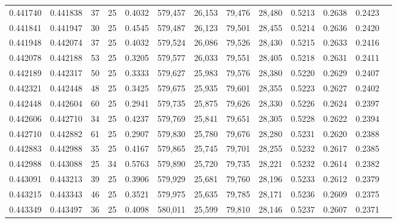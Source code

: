 \begin{tabular}{rrrrrrrrrrrrr}
0.441740 & 0.441838 &    37 &  25 &                                     0.4032 & 579,457 &  26,153 &  79,476 &  28,480 & 0.5213 & 0.2638 & 0.2423 \\
0.441841 & 0.441947 &    30 &  25 &                                     0.4545 & 579,487 &  26,123 &  79,501 &  28,455 & 0.5214 & 0.2636 & 0.2420 \\
0.441948 & 0.442074 &    37 &  25 &                                     0.4032 & 579,524 &  26,086 &  79,526 &  28,430 & 0.5215 & 0.2633 & 0.2416 \\
0.442078 & 0.442188 &    53 &  25 &                                     0.3205 & 579,577 &  26,033 &  79,551 &  28,405 & 0.5218 & 0.2631 & 0.2411 \\
0.442189 & 0.442317 &    50 &  25 &                                     0.3333 & 579,627 &  25,983 &  79,576 &  28,380 & 0.5220 & 0.2629 & 0.2407 \\
0.442321 & 0.442448 &    48 &  25 &                                     0.3425 & 579,675 &  25,935 &  79,601 &  28,355 & 0.5223 & 0.2627 & 0.2402 \\
0.442448 & 0.442604 &    60 &  25 &                                     0.2941 & 579,735 &  25,875 &  79,626 &  28,330 & 0.5226 & 0.2624 & 0.2397 \\
0.442606 & 0.442710 &    34 &  25 &                                     0.4237 & 579,769 &  25,841 &  79,651 &  28,305 & 0.5228 & 0.2622 & 0.2394 \\
0.442710 & 0.442882 &    61 &  25 &                                     0.2907 & 579,830 &  25,780 &  79,676 &  28,280 & 0.5231 & 0.2620 & 0.2388 \\
0.442883 & 0.442988 &    35 &  25 &                                     0.4167 & 579,865 &  25,745 &  79,701 &  28,255 & 0.5232 & 0.2617 & 0.2385 \\
0.442988 & 0.443088 &    25 &  34 &                                     0.5763 & 579,890 &  25,720 &  79,735 &  28,221 & 0.5232 & 0.2614 & 0.2382 \\
0.443091 & 0.443213 &    39 &  25 &                                     0.3906 & 579,929 &  25,681 &  79,760 &  28,196 & 0.5233 & 0.2612 & 0.2379 \\
0.443215 & 0.443343 &    46 &  25 &                                     0.3521 & 579,975 &  25,635 &  79,785 &  28,171 & 0.5236 & 0.2609 & 0.2375 \\
0.443349 & 0.443497 &    36 &  25 &                                     0.4098 & 580,011 &  25,599 &  79,810 &  28,146 & 0.5237 & 0.2607 & 0.2371 \\

\end{tabular}
